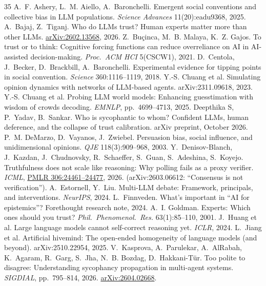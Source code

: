 \documentclass[10pt]{article}
\theoremstyle{manuscript}\newtheorem{proposition}{Proposition}
\begin{document}
\small
\clearpage
\begingroup\raggedright
\begin{thebibliography}{35}
 A.~F. Ashery, L.~M. Aiello, A.~Baronchelli. Emergent social conventions and collective bias in LLM populations. \emph{Science Advances} 11(20):eadu9368, 2025.
 A.~Bajaj, Z.~Tiganj. Who do LLMs trust? Human experts matter more than other LLMs. \href{https://arxiv.org/abs/2602.13568}{arXiv:2602.13568}, 2026.
 Z.~Bu\c{c}inca, M.~B. Malaya, K.~Z. Gajos. To trust or to think: Cognitive forcing functions can reduce overreliance on AI in AI-assisted decision-making. \emph{Proc.\ ACM HCI} 5(CSCW1), 2021.
 D.~Centola, J.~Becker, D.~Brackbill, A.~Baronchelli. Experimental evidence for tipping points in social convention. \emph{Science} 360:1116--1119, 2018.
 Y.-S. Chuang et al. Simulating opinion dynamics with networks of LLM-based agents. arXiv:2311.09618, 2023.
 Y.-S. Chuang et al. Probing LLM world models: Enhancing guesstimation with wisdom of crowds decoding. \emph{EMNLP}, pp.~4699--4713, 2025.
 Deepthika S, P.~Yadav, B.~Sankar. Who is sycophantic to whom? Confident LLMs, human deference, and the collapse of trust calibration. arXiv preprint, October 2026.
 P.~M. DeMarzo, D.~Vayanos, J.~Zwiebel. Persuasion bias, social influence, and unidimensional opinions. \emph{QJE} 118(3):909--968, 2003.
 Y.~Denisov-Blanch, J.~Kazdan, J.~Chudnovsky, R.~Schaeffer, S.~Guan, S.~Adeshina, S.~Koyejo. Truthfulness does not scale like reasoning: Why polling fails as a proxy verifier. \emph{ICML}, \href{https://proceedings.mlr.press/v306/denisov-blanch26a.html}{PMLR 306:24461--24477}, 2026. (arXiv:2603.06612: ``Consensus is not verification'').
 A.~Estornell, Y.~Liu. Multi-LLM debate: Framework, principals, and interventions. \emph{NeurIPS}, 2024.
 L.~Finnveden. What's important in ``AI for epistemics''? Forethought research note, 2024.
 A.~I. Goldman. Experts: Which ones should you trust? \emph{Phil.\ Phenomenol.\ Res.} 63(1):85--110, 2001.
 J.~Huang et al. Large language models cannot self-correct reasoning yet. \emph{ICLR}, 2024.
 L.~Jiang et al. Artificial hivemind: The open-ended homogeneity of language models (and beyond). arXiv:2510.22954, 2025.
 V.~Kasprova, A.~Parulekar, A.~AlRabah, K.~Agaram, R.~Garg, S.~Jha, N.~B. Bozdag, D.~Hakkani-T\"ur. Too polite to disagree: Understanding sycophancy propagation in multi-agent systems. \emph{SIGDIAL}, pp.~795--814, 2026. \href{https://arxiv.org/abs/2604.02668}{arXiv:2604.02668}.

\end{thebibliography}
\end{document}
